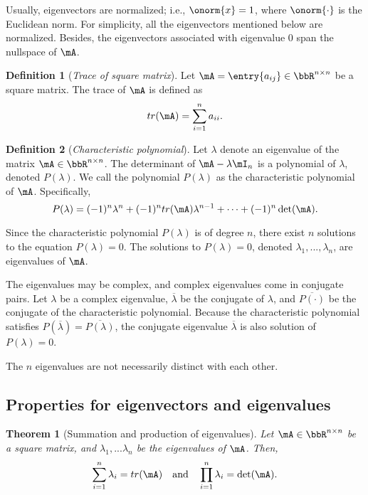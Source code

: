 \documentclass[11pt]{article}
\theoremstyle{plain}
\newtheorem{thm}{Theorem}[section]
\theoremstyle{definition}
\newtheorem{defn}{Definition}
\begin{document}
 Usually, eigenvectors are normalized; i.e., $\onorm{x} = 1$, where $\onorm{\cdot}$ is the Euclidean norm. For simplicity, all the eigenvectors mentioned below are normalized. Besides, the eigenvectors associated with eigenvalue 0 span the nullspace of $\mA$.

\begin{defn}[\textit{Trace of square matrix}]\label{def:trace}
Let $\mA = \entry{a_{ij}} \in \bbR^{n \times n}$ be a square matrix. The trace of $\mA$ is defined as
\[ tr(\mA) = \sum_{i = 1}^n a_{ii}.\] 
\end{defn}

\begin{defn}[\textit{Characteristic polynomial}]\label{def:charac}
	Let $\lambda$ denote an eigenvalue of the matrix $\mA\in \bbR^{n \times n}$.
	The determinant of $\mA - \lambda \mI_n$ is a polynomial of $\lambda$, denoted $P(\lambda)$. We call the polynomial $P(\lambda)$ as the characteristic polynomial of $\mA$. Specifically,
	\begin{equation}\label{def:charapoly}
		 P(\lambda)  = (-1)^n \lambda^n +  (-1)^n  tr(\mA)\lambda^{n-1} + \cdots + (-1)^n \det(\mA). 
	\end{equation}
\end{defn}

Since the characteristic polynomial $P(\lambda)$ is of degree $n$, there exist $n$ solutions to the equation $P(\lambda) = 0$. The solutions to $P(\lambda) = 0$, denoted $\lambda_1,...,\lambda_n$, are eigenvalues of $\mA$.

\vspace{0.2cm}
The eigenvalues may be complex, and  complex eigenvalues come in conjugate pairs. Let $\lambda$ be a complex eigenvalue, $\overline \lambda$ be the conjugate of $\lambda$, and $\overline{P(\cdot)}$ be the conjugate of the characteristic polynomial. Because the characteristic polynomial satisfies $P(\overline{ \lambda}) = \overline{ P(\lambda)}$, the conjugate eigenvalue $\overline \lambda$ is also solution of $P(\lambda) = 0$. 

\vspace{0.2cm}
The $n$ eigenvalues are not necessarily distinct with each other.


\subsection{Properties for eigenvectors and eigenvalues}

\begin{thm}[Summation and production of eigenvalues]\label{thm:speigen}
	Let  $\mA \in \bbR^{n \times n}$ be a square matrix, and $\lambda_1,...\lambda_n$ be the eigenvalues of $\mA$. Then,
	\begin{equation}
		\sum_{i=1}^n \lambda_i = tr(\mA)\quad \text{and} \quad \prod_{i=1}^n \lambda_i = \det(\mA).
	\end{equation} 
\end{thm}
\end{document}

